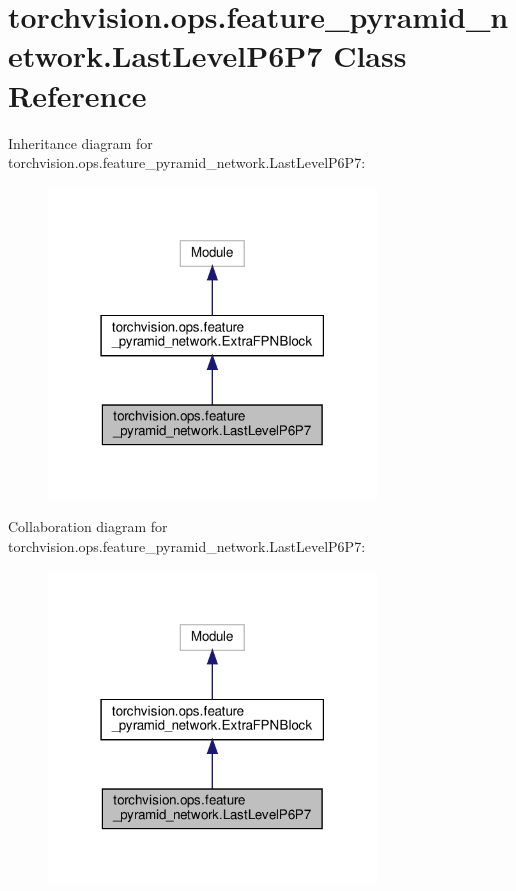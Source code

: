 \hypertarget{classtorchvision_1_1ops_1_1feature__pyramid__network_1_1LastLevelP6P7}{}\section{torchvision.\+ops.\+feature\+\_\+pyramid\+\_\+network.\+Last\+Level\+P6\+P7 Class Reference}
\label{classtorchvision_1_1ops_1_1feature__pyramid__network_1_1LastLevelP6P7}


Inheritance diagram for torchvision.\+ops.\+feature\+\_\+pyramid\+\_\+network.\+Last\+Level\+P6\+P7\+:
\nopagebreak
\begin{figure}[H]
\begin{center}
\leavevmode
\includegraphics[width=247pt]{classtorchvision_1_1ops_1_1feature__pyramid__network_1_1LastLevelP6P7__inherit__graph}
\end{center}
\end{figure}


Collaboration diagram for torchvision.\+ops.\+feature\+\_\+pyramid\+\_\+network.\+Last\+Level\+P6\+P7\+:
\nopagebreak
\begin{figure}[H]
\begin{center}
\leavevmode
\includegraphics[width=247pt]{classtorchvision_1_1ops_1_1feature__pyramid__network_1_1LastLevelP6P7__coll__graph}
\end{center}
\end{figure}
